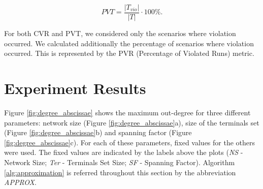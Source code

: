 \begin{equation}
\label{eq:percentage_violated_terminals}
  PVT = \frac{|T_{vio}|}{|T|} \cdot 100 \%.
\end{equation}

For both CVR and PVT, we considered only the scenarios where violation occurred. 
We calculated additionally the percentage of scenarios where violation occurred. This is represented by the PVR (Percentage of Violated Runs)
metric.


\section{Experiment Results}
\label{sec:experiment_results}
Figure \ref{fig:degree_abscissae} shows the maximum out-degree for three different parameters: network size (Figure \ref{fig:degree_abscissae}a), 
size of the terminals set (Figure \ref{fig:degree_abscissae}b) and spanning factor (Figure \ref{fig:degree_abscissae}c). 
For each of these parameters, fixed values for the others were used. The fixed values are indicated by the labels above the plots 
(\emph{NS} - Network Size; \emph{Ter} - Terminals Set Size; 
\emph{SF} - Spanning Factor). Algorithm \ref{alg:approximation} is referred throughout this section by the abbreviation \emph{APPROX}.

